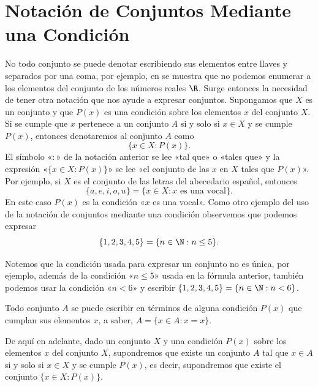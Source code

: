 \documentclass[12pt,a4paper]{book}
\begin{document}
    \section{Notación de Conjuntos Mediante una Condición}

    No todo conjunto se puede denotar escribiendo sus elementos entre llaves
    y separados por una coma, por ejemplo, en \cite{nunez2020analisis} se muestra que no podemos
    enumerar a los elementos del conjunto de los números reales $\R$. Surge entonces
    la necesidad de tener otra notación que nos ayude a expresar conjuntos.
    Supongamos que $X$ es un conjunto y que $P(x)$ es una condición sobre los
    elementos $x$ del conjunto $X$. Si se cumple que $x$ pertenece a un conjunto $A$
    si y solo si $x\in X$ y se cumple $P(x)$, entonces denotaremos al conjunto $A$
    como
    \begin{equation*}
        \{x\in X:P(x)\}.
    \end{equation*}
    El símbolo «$:$» de la notación anterior se lee «tal que» o «tales que» y la expresión
    «$\{x\in X:P(x)\}$» se lee «el conjunto de las $x$ en $X$ tales que $P(x)$».
    Por ejemplo, si $X$ es el conjunto de las letras del abecedario español, entonces
    \begin{equation*}
        \{a,e,i,o,u\}=\{x\in X:x\text{ es una vocal}\}.
    \end{equation*}
    En este caso $P(x)$ es la condición «$x$ es una vocal». Como otro ejemplo
    del uso de la notación de conjuntos mediante una condición observemos que
    podemos expresar
    \begin{equation*}
        \{1,2,3,4,5\}=\{n\in\N:n\leq 5\}.
    \end{equation*}

    Notemos que la condición usada para expresar un conjunto no es única,
    por ejemplo, además de la condición «$n\leq 5$» usada en la fórmula anterior,
    también podemos usar la condición «$n<6$» y escribir $\{1,2,3,4,5\}=\{n\in\N:n<6\}$.

    Todo conjunto $A$ se puede escribir en términos de alguna condición $P(x)$
    que cumplan sus elementos $x$, a saber, $A=\{x\in A:x=x\}$.

    De aquí en adelante, dado un conjunto $X$ y una condición $P(x)$ sobre los
    elementos $x$ del conjunto $X$, supondremos que existe un conjunto $A$ tal que
    $x\in A$ si y solo si $x\in X$ y se cumple $P(x)$, es decir, supondremos que existe
    el conjunto $\{x\in X:P(x)\}$.
\end{document}
